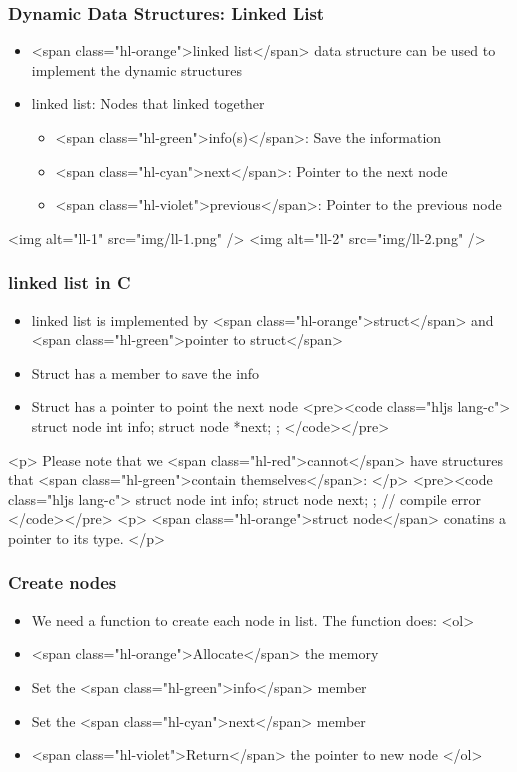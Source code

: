 \documentclass{../c-lecture}
\begin{document}
\begin{frame}
  \frametitle{Dynamic Data Structures: Linked List}
  \begin{itemize}
    \item
      <span class="hl-orange">linked list</span> data structure can be used to
      implement the dynamic structures

    \item linked list: Nodes that linked together
    \begin{itemize}
      \item <span class="hl-green">info(s)</span>: Save the information
      \item <span class="hl-cyan">next</span>: Pointer to the next node
      \item
        <span class="hl-violet">previous</span>: Pointer to the previous node

    \end{itemize}
  \end{itemize}
\end{frame}
\begin{frame}
  <img alt="ll-1" src="img/ll-1.png" />
  <img alt="ll-2" src="img/ll-2.png" />
\end{frame}
\begin{frame}
  \frametitle{linked list in C}
  \begin{itemize}
    \item
      linked list is implemented by
      <span class="hl-orange">struct</span> and
      <span class="hl-green">pointer to struct</span>

    \item Struct has a member to save the info
    \item Struct has a pointer to point the next node
    <pre><code class="hljs lang-c">
struct node{
  int info;
  struct node *next;
};
    </code></pre>
  \end{itemize}
\end{frame}
\begin{frame}
  <p>
    Please note that we <span class="hl-red">cannot</span> have structures that
    <span class="hl-green">contain themselves</span>:
  </p>
  <pre><code class="hljs lang-c">
struct node{
  int info;
  struct node next;
}; // compile error
  </code></pre>
  <p>
    <span class="hl-orange">struct node</span> conatins a pointer to its type.
  </p>
\end{frame}
\begin{frame}
  \frametitle{Create nodes}
  \begin{itemize}
    \item We need a function to create each node in list. The function does:
    <ol>
      \item <span class="hl-orange">Allocate</span> the memory
      \item Set the <span class="hl-green">info</span> member
      \item Set the <span class="hl-cyan">next</span> member
      \item <span class="hl-violet">Return</span> the pointer to new node
    </ol>
  \end{itemize}
\end{frame}
\end{document}
